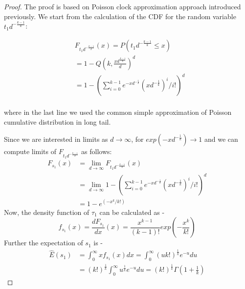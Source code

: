 \begin{proof}
 The proof is based on Poisson clock approximation approach
introduced {previously.} 
We start from the calculation of the CDF for the random variable $%
t_1 d^{-\frac{k-1}{k}}$:


\begin{equation}
\begin{aligned} &F_{t_1 d^{-\frac{k-1}{k}}}(x)=P(t_1 d^{-\frac{k-1}{k}}\leq
x)\\
&=1-Q(k,\frac{xd^{\frac{k-1}{k}}}{d})^d%
\\
&=1-\left(\sum_{i=0}^{k-1}e^{-xd^{-\frac{1}{k}}}(xd^{-%
\frac{1}{k}})^i/i!\right)^d\\ \label{eq-prof-1}
 \end{aligned}
\end{equation}

where in the last line we used the common simple approximation of Poisson
cumulative distribution in long tail.

Since we are interested in limits as $d\rightarrow \infty$, for $%
exp(-xd^{-\frac{1}{k}})\rightarrow 1$ and we can compute limits of $F_{t_1
d^{-\frac{k-1}{k}}}$ 
as follows: 
\begin{equation}
\begin{aligned} F_{s_1}(x)&=\lim_{d\rightarrow\infty}F_{t_1
d^{-\frac{k-1}{k}}}(x)\\&=\lim_{d\rightarrow\infty}1-\left(\sum_{i=0}^{k-1}e^{-xd^{-\frac{1}{k}}}(xd^{-%
\frac{1}{k}})^i/i!\right)^d \\&=
1-e^{(-x^k/k!)} \label{eq-prof-cdf1} \end{aligned}
\end{equation}
Now, the density function of $\tau_1$ can be calculated as - \\ 
\begin{equation}
f_{s_1}(x)=\frac{dF_{s_1}}{dx}(x)=\frac{x^{k-1}}{(k-1)!}exp%
\left(-\frac{x^{k}}{k!}\right)
\end{equation}
Further the expectation of $s_{1}$ is - 
 \begin{equation}
\begin{aligned}
\hat E(s_1)&=\int_{0}^{\infty}xf_{s_1}(x)dx=\int_{0}^{\infty}%
\left(uk!\right)^{\frac{1}{k}}e^{-u}du\\&=\left(k!\right)^{\frac{1}{k}}%
\int_{0}^{\infty}u^{\frac{1}{k}}e^{-u}du=\left(k!\right)^{\frac{1}{k}}\Gamma%
\left(1+\frac{1}{k}\right) \label{e-tau-1} 
\end{aligned}
\end{equation}
\end{proof}



